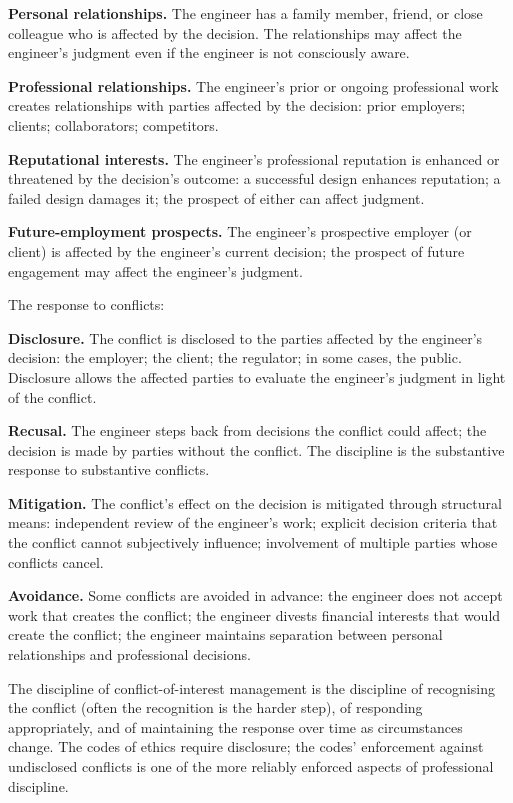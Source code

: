\textbf{Personal relationships.} The engineer has a family member, friend, or close colleague who is affected by the decision. The relationships may affect the engineer's judgment even if the engineer is not consciously aware.

\textbf{Professional relationships.} The engineer's prior or ongoing professional work creates relationships with parties affected by the decision: prior employers; clients; collaborators; competitors.

\textbf{Reputational interests.} The engineer's professional reputation is enhanced or threatened by the decision's outcome: a successful design enhances reputation; a failed design damages it; the prospect of either can affect judgment.

\textbf{Future-employment prospects.} The engineer's prospective employer (or client) is affected by the engineer's current decision; the prospect of future engagement may affect the engineer's judgment.

The response to conflicts:

\textbf{Disclosure.} The conflict is disclosed to the parties affected by the engineer's decision: the employer; the client; the regulator; in some cases, the public. Disclosure allows the affected parties to evaluate the engineer's judgment in light of the conflict.

\textbf{Recusal.} The engineer steps back from decisions the conflict could affect; the decision is made by parties without the conflict. The discipline is the substantive response to substantive conflicts.

\textbf{Mitigation.} The conflict's effect on the decision is mitigated through structural means: independent review of the engineer's work; explicit decision criteria that the conflict cannot subjectively influence; involvement of multiple parties whose conflicts cancel.

\textbf{Avoidance.} Some conflicts are avoided in advance: the engineer does not accept work that creates the conflict; the engineer divests financial interests that would create the conflict; the engineer maintains separation between personal relationships and professional decisions.

The discipline of conflict-of-interest management is the discipline of recognising the conflict (often the recognition is the harder step), of responding appropriately, and of maintaining the response over time as circumstances change. The codes of ethics require disclosure; the codes' enforcement against undisclosed conflicts is one of the more reliably enforced aspects of professional discipline.

